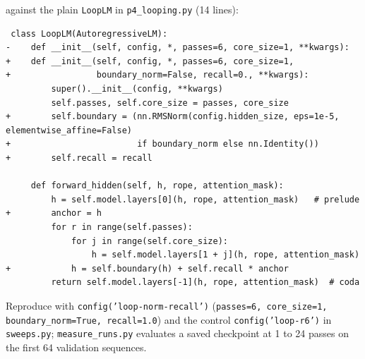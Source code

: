  against the plain \texttt{LoopLM} in \texttt{p4\_looping.py} (14 lines):
\begin{verbatim}
 class LoopLM(AutoregressiveLM):
-    def __init__(self, config, *, passes=6, core_size=1, **kwargs):
+    def __init__(self, config, *, passes=6, core_size=1,
+                 boundary_norm=False, recall=0., **kwargs):
         super().__init__(config, **kwargs)
         self.passes, self.core_size = passes, core_size
+        self.boundary = (nn.RMSNorm(config.hidden_size, eps=1e-5, elementwise_affine=False)
+                         if boundary_norm else nn.Identity())
+        self.recall = recall

     def forward_hidden(self, h, rope, attention_mask):
         h = self.model.layers[0](h, rope, attention_mask)   # prelude
+        anchor = h
         for r in range(self.passes):
             for j in range(self.core_size):
                 h = self.model.layers[1 + j](h, rope, attention_mask)
+            h = self.boundary(h) + self.recall * anchor
         return self.model.layers[-1](h, rope, attention_mask)  # coda
\end{verbatim}
Reproduce with \texttt{config('loop-norm-recall')} (\texttt{passes=6, core\_size=1, boundary\_norm=True, recall=1.0}) and the control \texttt{config('loop-r6')} in \texttt{sweeps.py}; \texttt{measure\_runs.py} evaluates a saved checkpoint at 1 to 24 passes on the first 64 validation sequences.
